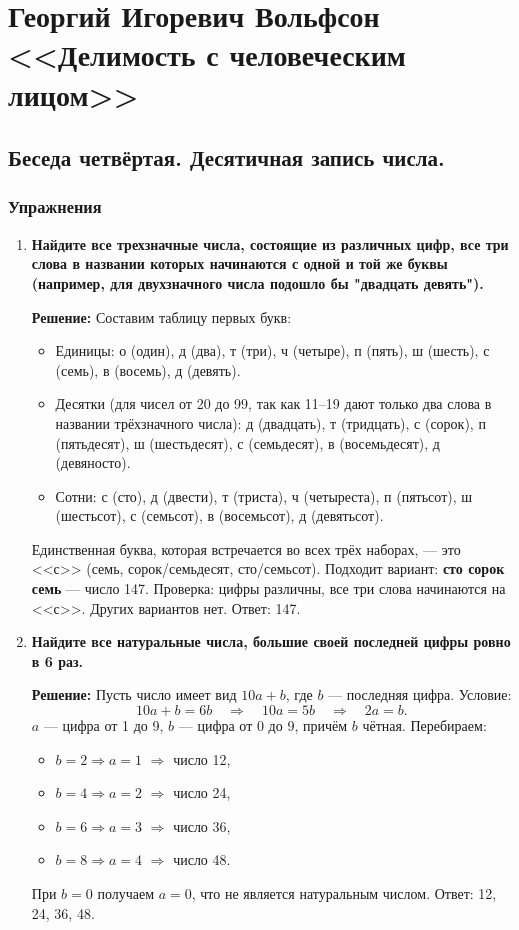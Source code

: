 \documentclass[12pt, a4paper]{article}
\begin{document}
\section*{Георгий Игоревич Вольфсон <<Делимость с человеческим лицом>>}

\subsection*{Беседа четвёртая. Десятичная запись числа.}

\subsubsection*{Упражнения}

\begin{enumerate}[label=\arabic*., wide=0pt, leftmargin=*]

\item \textbf{Найдите все трехзначные числа, состоящие из различных цифр, все три слова в названии которых начинаются с одной и той же буквы (например, для двухзначного числа подошло бы "двадцать девять").}

\textbf{Решение:} 
Составим таблицу первых букв:
\begin{itemize}
\item Единицы: о (один), д (два), т (три), ч (четыре), п (пять), ш (шесть), с (семь), в (восемь), д (девять).
\item Десятки (для чисел от 20 до 99, так как 11–19 дают только два слова в названии трёхзначного числа): д (двадцать), т (тридцать), с (сорок), п (пятьдесят), ш (шестьдесят), с (семьдесят), в (восемьдесят), д (девяносто).
\item Сотни: с (сто), д (двести), т (триста), ч (четыреста), п (пятьсот), ш (шестьсот), с (семьсот), в (восемьсот), д (девятьсот).
\end{itemize}
Единственная буква, которая встречается во всех трёх наборах, — это <<с>> (семь, сорок/семьдесят, сто/семьсот). Подходит вариант: \textbf{сто сорок семь} — число 147. 
Проверка: цифры различны, все три слова начинаются на <<с>>. Других вариантов нет. 
Ответ: 147.

\item \textbf{Найдите все натуральные числа, большие своей последней цифры ровно в 6 раз.}

\textbf{Решение:}
Пусть число имеет вид \(10a + b\), где \(b\) — последняя цифра. Условие:
\[
10a + b = 6b \quad\Rightarrow\quad 10a = 5b \quad\Rightarrow\quad 2a = b.
\]
\(a\) — цифра от 1 до 9, \(b\) — цифра от 0 до 9, причём \(b\) чётная. Перебираем:
\begin{itemize}
\item \(b = 2 \Rightarrow a = 1\) \(\Rightarrow\) число 12,
\item \(b = 4 \Rightarrow a = 2\) \(\Rightarrow\) число 24,
\item \(b = 6 \Rightarrow a = 3\) \(\Rightarrow\) число 36,
\item \(b = 8 \Rightarrow a = 4\) \(\Rightarrow\) число 48.
\end{itemize}
При \(b = 0\) получаем \(a = 0\), что не является натуральным числом.
Ответ: 12, 24, 36, 48.


\end{enumerate}
\end{document}
